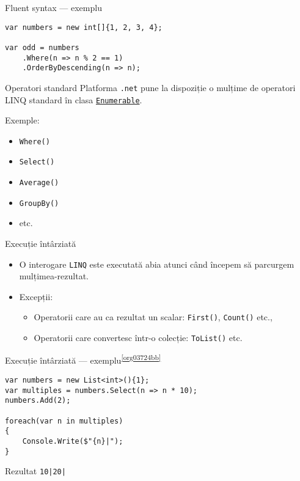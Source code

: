 \documentclass[presentation]{beamer}
\begin{document}
\begin{frame}[label={sec:org7861756},fragile]{Fluent syntax --- exemplu}
 \begin{verbatim}
var numbers = new int[]{1, 2, 3, 4};

var odd = numbers
    .Where(n => n % 2 == 1)
    .OrderByDescending(n => n);
\end{verbatim}
\end{frame}
\begin{frame}[label={sec:org0d32471},fragile]{Operatori standard}
 Platforma \texttt{.net} pune la dispoziție o mulțime de \alert{operatori LINQ standard} în clasa \href{https://docs.microsoft.com/en-us/dotnet/api/system.linq.enumerable?view=netcore-3.1}{\texttt{Enumerable}}.


Exemple:
\begin{itemize}
\item \texttt{Where()}
\item \texttt{Select()}
\item \texttt{Average()}
\item \texttt{GroupBy()}
\item etc.
\end{itemize}
\end{frame}
\begin{frame}[label={sec:orgf84a667},fragile]{Execuție întârziată}
 \begin{itemize}
\item O interogare \texttt{LINQ} este executată abia atunci când începem să parcurgem mulțimea-rezultat.
\item Excepții:
\begin{itemize}
\item Operatorii care au ca rezultat un scalar: \texttt{First()}, \texttt{Count()} etc.,
\item Operatorii care convertesc într-o colecție: \texttt{ToList()} etc.
\end{itemize}
\end{itemize}
\end{frame}
\begin{frame}[label={sec:org6c2a884},fragile]{Execuție întârziată --- exemplu\textsuperscript{\ref{org03724bb}}}
 \begin{verbatim}
var numbers = new List<int>(){1};
var multiples = numbers.Select(n => n * 10);
numbers.Add(2);

foreach(var n in multiples)
{
    Console.Write($"{n}|");
}
\end{verbatim}
\begin{block}{Rezultat}
\texttt{10|20|}
\end{block}
\end{frame}
\end{document}
